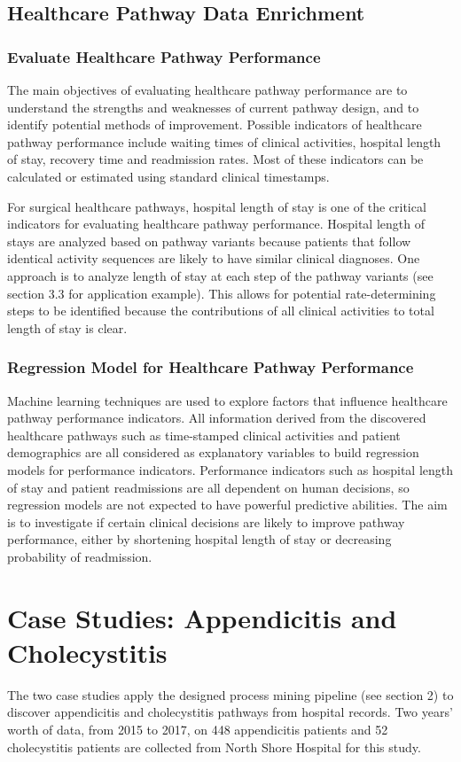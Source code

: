 \documentclass{elsarticle}
\begin{document}
\subsection{Healthcare Pathway Data Enrichment}
\subsubsection{Evaluate Healthcare Pathway Performance}
The main objectives of evaluating healthcare pathway performance are to understand the strengths and weaknesses of current pathway design, and to identify potential methods of improvement. Possible indicators of healthcare pathway performance include waiting times of clinical activities, hospital length of stay, recovery time and readmission rates. Most of these indicators can be calculated or estimated using standard clinical timestamps.

For surgical healthcare pathways, hospital length of stay is one of the critical indicators for evaluating healthcare pathway performance. Hospital length of stays are analyzed based on pathway variants because patients that follow identical activity sequences are likely to have similar clinical diagnoses. One approach is to analyze length of stay at each step of the pathway variants (see section 3.3 for application example). This allows for potential rate-determining steps to be identified because the contributions of all clinical activities to total length of stay is clear.

\subsubsection{Regression Model for Healthcare Pathway Performance}
Machine learning techniques are used to explore factors that influence healthcare pathway performance indicators. All information derived from the discovered healthcare pathways such as time-stamped clinical activities and patient demographics are all considered as explanatory variables to build regression models for performance indicators. Performance indicators such as hospital length of stay and patient readmissions are all dependent on human decisions, so regression models are not expected to have powerful predictive abilities.  The aim is to investigate if certain clinical decisions are likely to improve pathway performance, either by shortening hospital length of stay or decreasing probability of readmission.

\section{Case Studies: Appendicitis and Cholecystitis}
The two case studies apply the designed process mining pipeline (see section 2) to discover appendicitis and cholecystitis pathways from hospital records. Two years’ worth of data, from 2015 to 2017, on 448 appendicitis patients and 52 cholecystitis patients are collected from North Shore Hospital for this study. 
\end{document}
